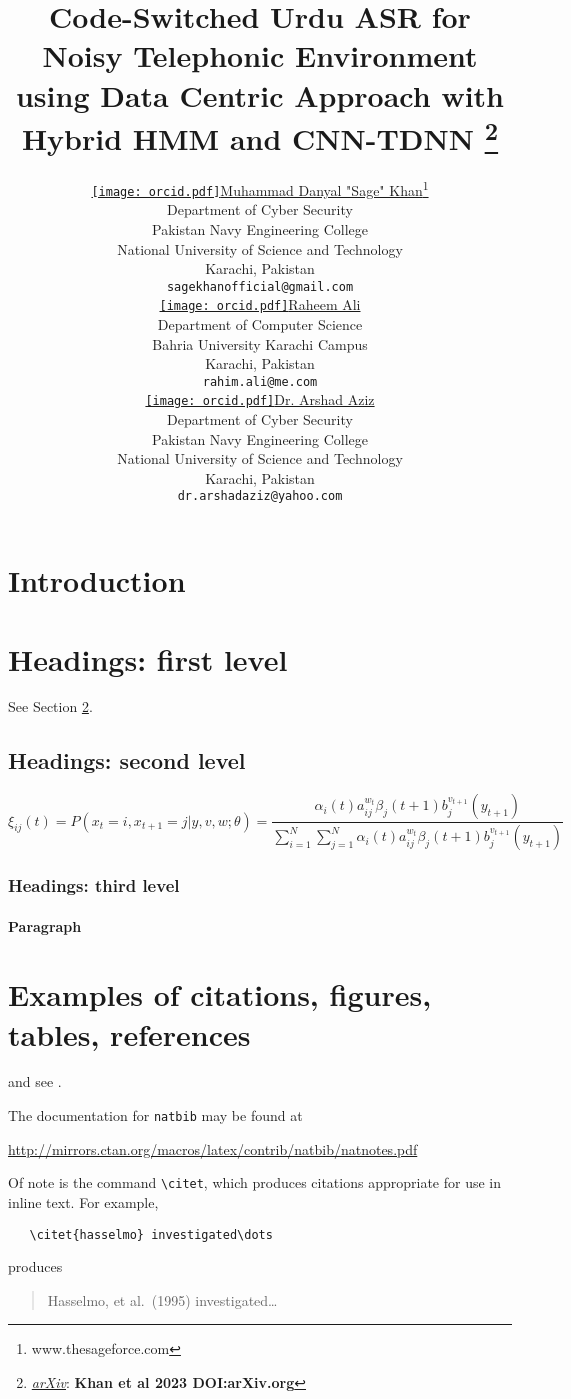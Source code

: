 \documentclass{article}
\title{Code-Switched Urdu ASR for Noisy Telephonic Environment using Data Centric Approach with Hybrid HMM and CNN-TDNN
\thanks{\textit{\underline{arXiv}}: 
\textbf{Khan et al 2023 DOI:arXiv.org}} 
}
\author{ \href{https://orcid.org/0009-0001-5084-6122}{\texttt{[image: orcid.pdf]}\hspace{1mm}Muhammad Danyal "Sage" Khan}\thanks{www.thesageforce.com} \\
	Department of Cyber Security \\
	Pakistan Navy Engineering College \\
	National University of Science and Technology \\
        Karachi, Pakistan \\
	\texttt{sagekhanofficial@gmail.com} \\
	\And
	\href{https://www.linkedin.com/in/alirahim/}{\texttt{[image: orcid.pdf]}\hspace{1mm}Raheem Ali} \\
	Department of Computer Science\\
	Bahria University Karachi Campus\\
	Karachi, Pakistan \\
	\texttt{rahim.ali@me.com} \\
        \And
	\href{https://www.linkedin.com/in/arshad-aziz-ph-d-2b0a99172/}{\texttt{[image: orcid.pdf]}\hspace{1mm}Dr. Arshad Aziz} \\
	Department of Cyber Security \\
	Pakistan Navy Engineering College \\
	National University of Science and Technology \\
        Karachi, Pakistan \\
	\texttt{dr.arshadaziz@yahoo.com} \\
}
\begin{document}
\maketitle


\begin{abstract}
 
\end{abstract}




\section{Introduction}
\lipsum[2]
\lipsum[3]


\section{Headings: first level}
\label{sec:headings}

\lipsum[4] See Section \ref{sec:headings}.

\subsection{Headings: second level}
\lipsum[5]
\begin{equation}
\xi _{ij}(t)=P(x_{t}=i,x_{t+1}=j|y,v,w;\theta)= {\frac {\alpha _{i}(t)a^{w_t}_{ij}\beta _{j}(t+1)b^{v_{t+1}}_{j}(y_{t+1})}{\sum _{i=1}^{N} \sum _{j=1}^{N} \alpha _{i}(t)a^{w_t}_{ij}\beta _{j}(t+1)b^{v_{t+1}}_{j}(y_{t+1})}}
\end{equation}

\subsubsection{Headings: third level}
\lipsum[6]

\paragraph{Paragraph}
\lipsum[7]

\section{Examples of citations, figures, tables, references}
\label{sec:others}
\lipsum[8] \cite{kour2014real,kour2014fast} and see \cite{hadash2018estimate}.

The documentation for \verb+natbib+ may be found at
\begin{center}
  \url{http://mirrors.ctan.org/macros/latex/contrib/natbib/natnotes.pdf}
\end{center}
Of note is the command \verb+\citet+, which produces citations
appropriate for use in inline text.  For example,
\begin{verbatim}
   \citet{hasselmo} investigated\dots
\end{verbatim}
produces
\begin{quote}
  Hasselmo, et al.\ (1995) investigated\dots
\end{quote}
\end{document}
